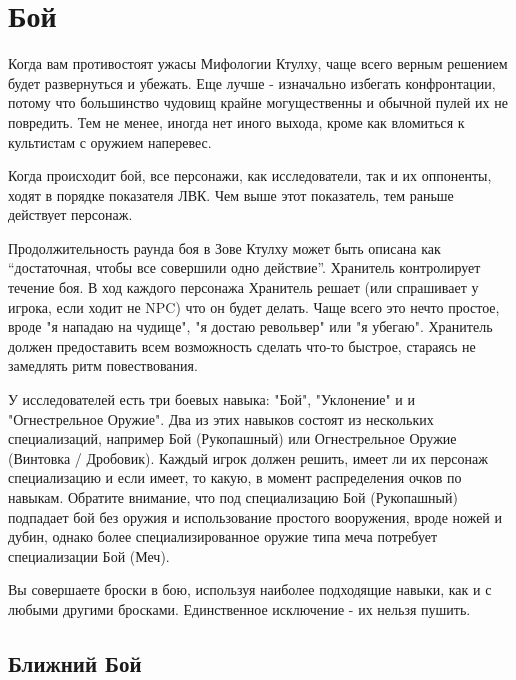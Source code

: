 \documentclass[letterpaper,twocolumn,openany, twoside, 11pt, usenames]{cocbook}
\begin{document}
\section*{Бой}

Когда вам противостоят ужасы Мифологии Ктулху, чаще всего верным решением будет развернуться и убежать. Еще лучше - изначально избегать конфронтации, потому что большинство чудовищ крайне могущественны и обычной пулей их не повредить. Тем не менее, иногда нет иного выхода, кроме как вломиться к культистам с оружием наперевес.

Когда происходит бой, все персонажи, как исследователи, так и их оппоненты, ходят в порядке показателя ЛВК. Чем выше этот показатель, тем раньше действует персонаж.

\smallbreak
\noindent {}

Продолжительность раунда боя в Зове Ктулху может быть описана как ``достаточная, чтобы все совершили одно действие''. Хранитель контролирует течение боя. В ход каждого персонажа Хранитель решает (или спрашивает у игрока, если ходит не NPC) что он будет делать. Чаще всего это нечто простое, вроде "я нападаю на чудище", "я достаю револьвер" или "я убегаю". Хранитель должен предоставить всем возможность сделать что-то быстрое, стараясь не замедлять ритм повествования.

У исследователей есть три боевых навыка: "Бой", "Уклонение" и и "Огнестрельное Оружие". Два из этих навыков состоят из нескольких специализаций, например Бой (Рукопашный) или Огнестрельное Оружие (Винтовка / Дробовик). Каждый игрок должен решить, имеет ли их персонаж специализацию и если имеет, то какую, в момент распределения очков по навыкам. Обратите внимание, что под специализацию Бой (Рукопашный) подпадает бой без оружия и использование простого вооружения, вроде ножей и дубин, однако более специализированное оружие типа меча потребует специализации Бой (Меч).

Вы совершаете броски в бою, используя наиболее подходящие навыки, как и с любыми другими бросками. Единственное исключение - их нельзя пушить.

\subsection*{Ближний Бой}
\end{document}

